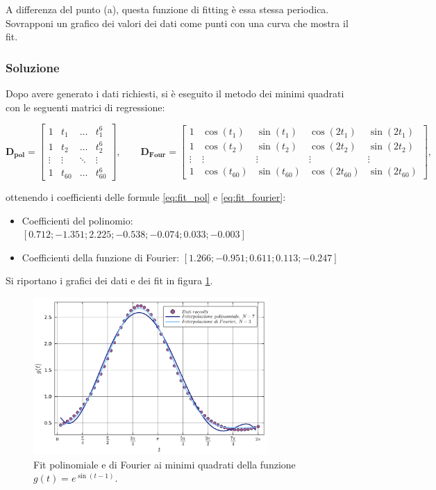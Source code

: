 \documentclass[letterpaper, 12pt]{article}
\begin{document}
A differenza del punto (a), questa funzione di fitting è essa stessa periodica. 
Sovrapponi un grafico dei valori dei dati come punti con una curva che mostra il fit.

\subsubsection{Soluzione}
Dopo avere generato i dati richiesti, si è eseguito il metodo dei minimi quadrati con le seguenti 
matrici di regressione:

\begin{equation}
    \mathbf{D_{pol}} = \begin{bmatrix}
        1 & t_1 & \hdots & t_1^6 \\
        1 & t_2 & \hdots & t_2^6 \\
        \vdots & \vdots & \ddots& \vdots \\
        1 & t_{60} & \hdots & t_{60}^6
    \end{bmatrix},
    \qquad
    \mathbf{D_{Four}} = \begin{bmatrix}
        1 & \cos(t_1) & \sin(t_1) & \cos(2t_1) & \sin(2t_1) \\
        1 & \cos(t_2) & \sin(t_2) & \cos(2t_2) & \sin(2t_2) \\
        \vdots & \vdots & \vdots & \vdots & \vdots \\
        1 & \cos(t_{60}) & \sin(t_{60}) & \cos(2t_{60}) & \sin(2t_{60})
    \end{bmatrix},
\end{equation}

ottenendo i coefficienti delle formule \ref{eq:fit_pol} e \ref{eq:fit_fourier}:
\begin{itemize}
    \item Coefficienti del polinomio: $[0.712; -1.351; 2.225; -0.538; -0.074; 0.033; -0.003]$
    \item Coefficienti della funzione di Fourier: $[1.266; -0.951; 0.611; 0.113; -0.247]$
\end{itemize}

Si riportano i grafici dei dati e dei fit in figura \ref{fig:es2_6_3_1}.
\begin{figure}[!ht]
    \centering
    \includegraphics[width=0.8\textwidth]{2631.pdf}
    \caption{Fit polinomiale e di Fourier ai minimi quadrati della funzione $g(t)=e^{\sin(t-1)}$.}
    \label{fig:es2_6_3_1}
\end{figure}
\end{document}
